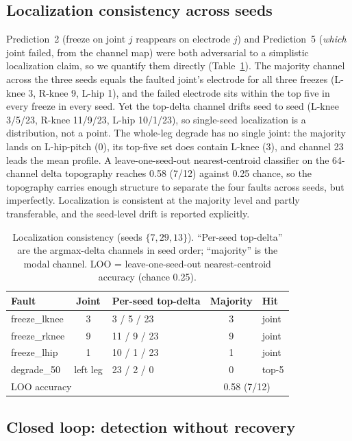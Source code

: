 \subsection{Localization consistency across seeds}

Prediction~2 (freeze on joint $j$ reappears on electrode $j$) and
Prediction~5 (\emph{which} joint failed, from the channel map) were both
adversarial to a simplistic localization claim, so we quantify them directly
(Table~\ref{tab:localization}). The majority
channel across the three seeds equals the faulted joint's electrode for all
three freezes (L-knee 3, R-knee 9, L-hip 1), and the failed electrode sits
within the top five in every freeze in every seed. Yet the top-delta channel
drifts seed to seed (L-knee 3/5/23, R-knee 11/9/23, L-hip 10/1/23), so
single-seed localization is a distribution, not a point. The whole-leg degrade
has no single joint: the majority lands on L-hip-pitch (0), its top-five set
does contain L-knee (3), and channel 23 leads the mean profile. A
leave-one-seed-out nearest-centroid classifier on the 64-channel delta
topography reaches 0.58 (7/12) against 0.25 chance, so the topography carries
enough structure to separate the four faults across seeds, but imperfectly.
Localization is consistent at the majority level and partly transferable, and
the seed-level drift is reported explicitly.

\begin{table}[t]
\caption{Localization consistency (seeds $\{7, 29, 13\}$). ``Per-seed
top-delta'' are the argmax-delta channels in seed order; ``majority'' is the
modal channel. LOO = leave-one-seed-out nearest-centroid accuracy
(chance 0.25).}
\label{tab:localization}
\centering
\small
\renewcommand{\arraystretch}{1.15}
\begin{tabular}{@{}lclcl@{}}
\toprule
Fault & Joint & Per-seed top-delta & Majority & Hit \\
\midrule
freeze\_lknee & 3 & 3 / 5 / 23 & 3 & joint \\
freeze\_rknee & 9 & 11 / 9 / 23 & 9 & joint \\
freeze\_lhip & 1 & 10 / 1 / 23 & 1 & joint \\
degrade\_50 & left leg & 23 / 2 / 0 & 0 & top-5 \\
\midrule
\multicolumn{3}{l}{LOO accuracy} & \multicolumn{2}{c}{0.58 (7/12)} \\
\bottomrule
\end{tabular}
\end{table}

\subsection{Closed loop: detection without recovery}

